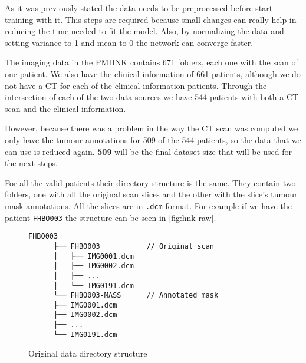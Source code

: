 



As it was previously stated the data needs to be preprocessed before start training with it.
This steps are required because small changes can really help in reducing the time needed to
fit the model. Also, by normalizing the data and setting variance to 1 and mean to 0 the network
can converge faster.
~\cite{neural:efficient-backprop}


The imaging data in the \Gls{PMHNK} contains 671 folders, each one with the scan of one patient. 
We also have the clinical information of 661 patients, although we do not have a \gls{CT} for
each of the clinical information patients. Through the intersection of each of the two data
sources we have 544 patients with both a \gls{CT} scan and the clinical information.

However, because there was a problem in the way the \gls{CT} scan was computed we only have
the tumour annotations for 509 of the 544 patients, so the data that we can use is reduced
again. \textbf{509} will be the final dataset size that will be used for the next 
steps.

For all the valid patients their directory structure is the same. They contain two folders,
one with all the original scan slices and the other with the slice's tumour mask annotations. 
All the slices are in \verb|.dcm| format.
For example if we have the patient \texttt{FHBO003} the structure can be seen in 
\autoref{fig:hnk-raw}.

\begin{figure}
  \centering
  \begin{minipage}{0.8\textwidth}
    \begin{Verbatim}[samepage=true]
      FHBO003
      ├── FHBO003           // Original scan
      │   ├── IMG0001.dcm
      │   ├── IMG0002.dcm
      │   ├── ...
      │   └── IMG0191.dcm
      └── FHBO003-MASS      // Annotated mask
      ├── IMG0001.dcm
      ├── IMG0002.dcm
      ├── ...
      └── IMG0191.dcm
    \end{Verbatim}
  \end{minipage}
    
  \caption{Original data directory structure \label{fig:hnk-raw}}
\end{figure}

